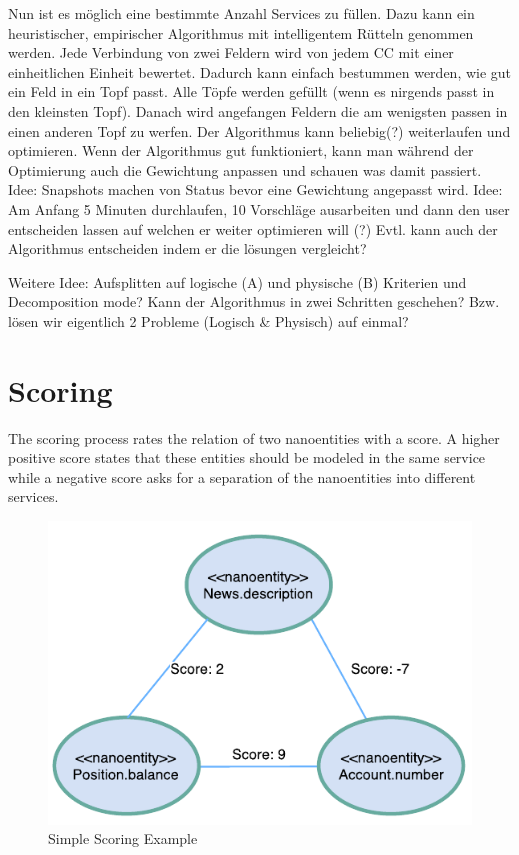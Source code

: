 Nun ist es möglich eine bestimmte Anzahl Services zu füllen. Dazu kann ein heuristischer, empirischer Algorithmus mit intelligentem Rütteln genommen werden. 
Jede Verbindung von zwei Feldern wird von jedem CC mit einer einheitlichen Einheit bewertet. Dadurch kann einfach bestummen werden, wie gut ein Feld in ein Topf passt. Alle Töpfe werden gefüllt (wenn es nirgends passt in den kleinsten Topf). Danach wird angefangen Feldern die am wenigsten passen in einen anderen Topf zu werfen.
Der Algorithmus kann beliebig(?) weiterlaufen und optimieren. Wenn der Algorithmus gut funktioniert, kann man während der Optimierung auch die Gewichtung anpassen und schauen was damit passiert.
Idee: Snapshots machen von Status bevor eine Gewichtung angepasst wird.
Idee: Am Anfang 5 Minuten durchlaufen, 10 Vorschläge ausarbeiten und dann den user entscheiden lassen auf welchen er weiter optimieren will (?) Evtl. kann auch der Algorithmus entscheiden indem er die lösungen vergleicht? 

Weitere Idee: Aufsplitten auf logische (A) und physische (B) Kriterien und Decomposition mode? Kann der Algorithmus in zwei Schritten geschehen? Bzw. lösen wir eigentlich 2 Probleme (Logisch \& Physisch) auf einmal?


\section{Scoring}

The scoring process rates the relation of two nanoentities with a score. A higher positive score states that these entities should be modeled in the same service while a negative score asks for a separation of the nanoentities into different services.

\begin{figure}[H]
	\begin{center}
		\includegraphics[scale=1]{diagrams/scoring_example.pdf}
		\caption{Simple Scoring Example}
		\label{fig:scoringExample}
	\end{center}
\end{figure}

